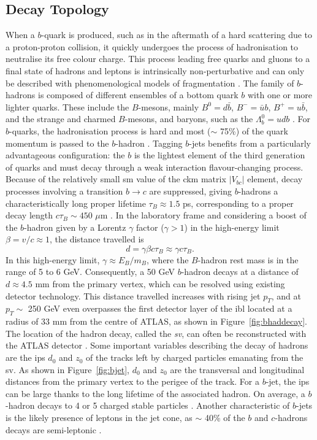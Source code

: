 \subsection{Decay Topology}
When a $b$-quark is produced, such as in the aftermath of a hard scattering due to a proton-proton collision, it quickly undergoes the process of hadronisation to neutralise its free colour charge. This process leading free quarks and gluons to a final state of hadrons and leptons is intrinsically non-perturbative and can only be described with phenomenological models of fragmentation \cite{Webber:419784}. The family of $b$-hadrons is composed of different ensembles of a bottom quark $b$ with one or more lighter quarks. These include the $B$-mesons, mainly $B^0=d\bar{b}$, $B^-=\bar{u}b$, $B^+=u\bar{b}$, and the strange and charmed $B$-mesons, and baryons, such as the $\Lambda_b^0=udb$ \cite{ATL-PHYS-PUB-2014-008}. For $b$-quarks, the hadronisation process is hard and most ($\sim$ 75\%) of the quark momentum is passed to the $b$-hadron \cite{Webber:419784}. Tagging $b$-jets benefits from a particularly advantageous configuration: the $b$ is the lightest element of the third generation of quarks and must decay through a weak interaction flavour-changing process. Because of the relatively small \gls{sm} value of the \gls{ckm} matrix $|V_{bc}|$ element, decay processes involving a transition $b \rightarrow c$ are suppressed, giving $b$-hadrons a characteristically long proper lifetime $\tau_B \approx 1.5$ ps, corresponding to a proper decay length $c\tau_{B} \sim 450$ $\mu$m \cite{Tanabashi:2018oca}. In the laboratory frame and considering a boost of the $b$-hadron given by a Lorentz $\gamma$ factor ($\gamma > 1$) in the high-energy limit $\beta = v/c \approx 1$, the distance travelled is \[d = \gamma \beta c \tau_B \approx \gamma c \tau_B.\] In this high-energy limit, $\gamma \approx E_B / m_B$, where the $B$-hadron rest mass is in the range of 5 to 6 GeV. Consequently, a 50 GeV $b$-hadron decays at a distance of $d \approx 4.5$ mm from the primary vertex, which can be resolved using existing detector technology. This distance travelled increases with rising jet $p_T$, and at $p_T \sim$ 250 GeV even overpasses the first detector layer of the \gls{ibl} located at a radius of 33 mm from the centre of ATLAS, as shown in Figure~\ref{fig:bhaddecay}. The location of the hadron decay, called the \textit{\gls{sv}}, can often be reconstructed with the ATLAS detector \cite{Aad:2019aic}. Some important variables describing the decay of hadrons are the \glspl{ip} $d_0$ and $z_0$ of the tracks left by charged particles emanating from the \gls{sv}. As shown in Figure~\ref{fig:bjet}, $d_0$ and $z_0$ are the transversal and longitudinal distances from the primary vertex to the perigee of the track. For a $b$-jet, the \glspl{ip} can be large thanks to the long lifetime of the associated hadron. On average, a $b$-hadron decays to 4 or 5 charged stable particles \cite{ATL-PHYS-PUB-2014-008}. Another characteristic of $b$-jets is the likely presence of leptons in the jet cone, as $\sim$ 40\% of the $b$ and $c$-hadrons decays are semi-leptonic \cite{Tanabashi:2018oca}. \\

